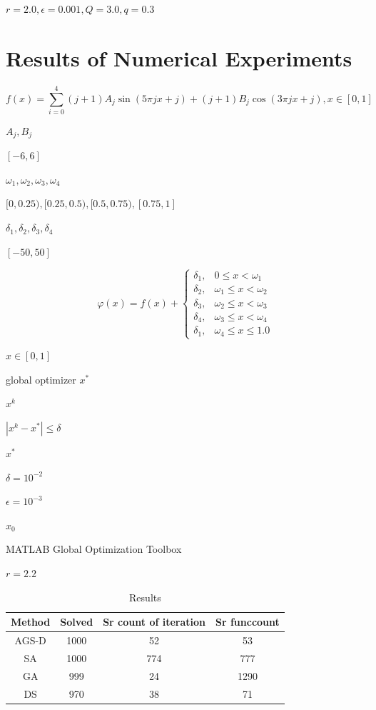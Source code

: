 \documentclass[runningheads]{llncs}
\begin{document}
$r=2.0,\epsilon=0.001,Q=3.0,q=0.3$

\section{Results of Numerical Experiments}

\cite{Audet}
\cite{Goldberg}
\cite{Kirkpatrick}
\cite{MatlabOTB}

\begin{equation}\label{seriaFunction}
f(x) =  \sum_{i=0}^4{(j+1)A_j\sin{(5\pi jx+j)}+(j+1)B_j\cos(3\pi jx+j)}, x\in[0,1]
\end{equation}

$A_j,B_j$

$[-6,6]$

$\omega_1,\omega_2,\omega_3,\omega_4$

$[0,0.25), [0.25,0.5), [0.5,0.75), [0.75,1]$

$\delta_1,\delta_2,\delta_3,\delta_4$

$[-50,50]$

\begin{equation}\label{seriaFunction_jump}
\varphi(x) =  f(x)+
\begin{cases}
	\delta_1, &0 \leq x < \omega_1\\
	\delta_2, &\omega_1 \leq x < \omega_2\\
	\delta_3, &\omega_2 \leq x < \omega_3\\
	\delta_4, &\omega_3 \leq x < \omega_4\\
	\delta_1, &\omega_4 \leq x \leq 1.0
\end{cases}
\end{equation}

$x\in[0,1]$

global optimizer $x^*$

$x^k$

$|x^k-x^* | \leq \delta$

$x^*$

$\delta= 10^{-2}$

$\epsilon = 10^{-3}$

$x_0$

 MATLAB Global Optimization Toolbox

$r=2.2$

\begin{table}[h]
	\caption{Results}
	\begin{center}
		\begin{tabular}{|c|c|c|c|}
			\hline
			Method & Solved & Sr count of iteration & Sr funccount \\
			\hline
			\hline
                                AGS-D & 1000  &  52  &  53 \\
                                \hline
                                SA    &  1000  &  774  &  777  \\
			\hline
			GA    &   999  &  24  &  1290  \\
			\hline
                                DS    &  970  & 38  &  71  \\
			\hline
		\end{tabular}
	\end{center}
\end{table}
\end{document}
